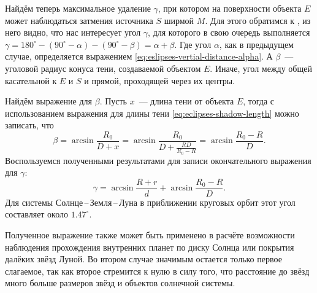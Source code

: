 \begin{figure}[h!]
    \caption{}
    \label{pic:partial-eclipse-vertical-distance}
\end{figure}

Найдём теперь максимальное удаление $\gamma$, при котором на поверхности объекта $E$ может наблюдаться  затмения источника $S$ ширмой $M$. Для этого обратимся к , из него видно, что нас интересует угол $\gamma$, для которого в свою очередь выполняется $\gamma = 180^\circ - (90^\circ - \alpha) - (90^\circ - \beta) = \alpha + \beta$. Где угол $\alpha$, как в предыдущем случае, определяется выражением \eqref{eq:eslipses-vertial-distance-alpha}. А $\beta$~--- уголовой радиус конуса тени, создаваемой объектом $E$. Иначе, угол между общей касательной к $E$ и $S$ и прямой, проходящей через их центры.

Найдём выражение для $\beta$. Пусть $x$~--- длина тени от объекта $E$, тогда с использованием выражения для длины тени \eqref{eq:eclipses-shadow-length} можно записать, что 
\begin{equation*}
    \beta = \arcsin \frac{R_0}{D + x} = \arcsin \frac{R_0}{D + \frac{RD}{R_0 - R}} = \arcsin\frac{R_0 - R}{D}.
\end{equation*}
Воспользуемся полученными результатами для записи окончательного выражения для $\gamma$:
\begin{equation*}
    \gamma = \arcsin \frac{R + r}{d} + \arcsin\frac{R_0 - R}{D}.
\end{equation*}
Для системы Солнце\,--\,Земля\,--\,Луна в приближении круговых орбит этот угол составляет около $1.47^\circ$. 

Полученное выражение также может быть применено в расчёте возможности наблюдения прохождения внутренних планет по диску Солнца или покрытия далёких звёзд Луной. Во втором случае значимым остается только первое слагаемое, так как второе стремится к нулю в силу того, что расстояние до звёзд много больше размеров звёзд и объектов солнечной системы.

